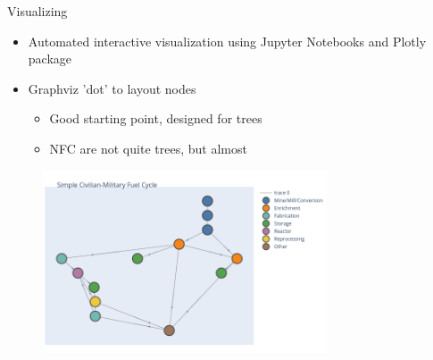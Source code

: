 \begin{frame}{Visualizing}
    \begin{itemize}
        \item Automated interactive visualization using Jupyter Notebooks and Plotly package
        \item Graphviz 'dot' to layout nodes
        \begin{itemize}
            \item Good starting point, designed for trees
            \item NFC are not quite trees, but almost
        \end{itemize}
    \end{itemize}
    \begin{figure}
        \centering
        \includegraphics[width=0.75\textwidth]{images/newplot.png}
        \label{fig:example_viz}
    \end{figure}
\end{frame}


